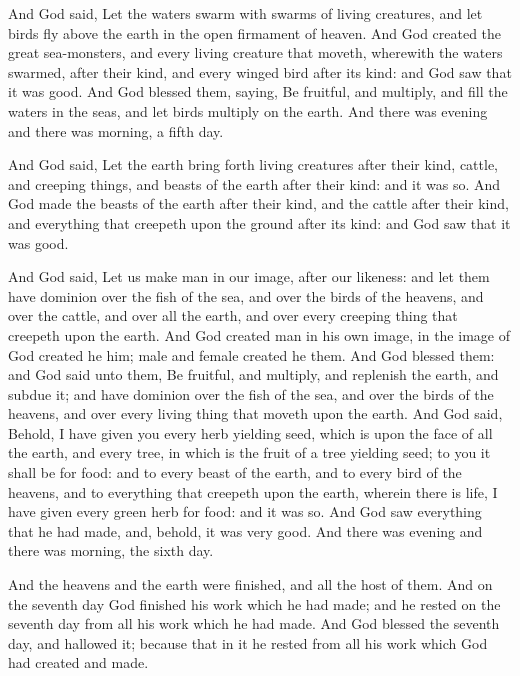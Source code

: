 And God said, Let the waters swarm with swarms of living creatures, and let birds fly above the earth in the open firmament of heaven. And God created the great sea-monsters, and every living creature that moveth, wherewith the waters swarmed, after their kind, and every winged bird after its kind: and God saw that it was good. And God blessed them, saying, Be fruitful, and multiply, and fill the waters in the seas, and let birds multiply on the earth. And there was evening and there was morning, a fifth day.  

And God said, Let the earth bring forth living creatures after their kind, cattle, and creeping things, and beasts of the earth after their kind: and it was so. And God made the beasts of the earth after their kind, and the cattle after their kind, and everything that creepeth upon the ground after its kind: and God saw that it was good. 

And God said, Let us make man in our image, after our likeness: and let them have dominion over the fish of the sea, and over the birds of the heavens, and over the cattle, and over all the earth, and over every creeping thing that creepeth upon the earth. And God created man in his own image, in the image of God created he him; male and female created he them. And God blessed them: and God said unto them, Be fruitful, and multiply, and replenish the earth, and subdue it; and have dominion over the fish of the sea, and over the birds of the heavens, and over every living thing that moveth upon the earth. And God said, Behold, I have given you every herb yielding seed, which is upon the face of all the earth, and every tree, in which is the fruit of a tree yielding seed; to you it shall be for food: and to every beast of the earth, and to every bird of the heavens, and to everything that creepeth upon the earth, wherein there is life, I have given every green herb for food: and it was so. And God saw everything that he had made, and, behold, it was very good. And there was evening and there was morning, the sixth day. 

And the heavens and the earth were finished, and all the host of them. And on the seventh day God finished his work which he had made; and he rested on the seventh day from all his work which he had made. And God blessed the seventh day, and hallowed it; because that in it he rested from all his work which God had created and made.  

